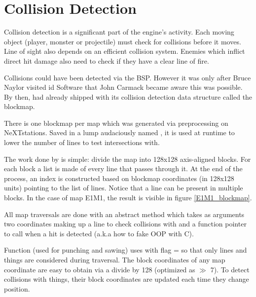 \section{Collision Detection} \label{blockmapdetails}
Collision detection is a significant part of the engine's activity. Each moving object (player, monster or projectile) must check for collisions before it moves. Line of sight also depends on an efficient collision system. Enemies which inflict direct hit damage also need to check if they have a clear line of fire.\\
\par
Collisions could have been detected via the BSP. However it was only after Bruce Naylor visited id Software that John Carmack became aware this was possible. By then, \doom{} had already shipped with its collision detection data structure called the blockmap.\\
\par
\vspace{10pt}
\par
There is one blockmap per map which was generated via  preprocessing on NeXTstations. Saved in a lump audaciously named , it is used at runtime to lower the number of lines to test intersections with.\\
\par
The work done by  is simple: divide the map into 128x128 axis-aligned blocks. For each block a list is made of every line that passes through it. At the end of the process, an index is constructed based on blockmap coordinates (in 128x128 units) pointing to the list of lines. Notice that a line can be present in multiple blocks. In the case of map E1M1, the result is visible in figure \ref{E1M1_blockmap}.


All map traversals are done with an abstract method  which takes as arguments two coordinates making up a line to check collisions with and a function pointer to call when a hit is detected (a.k.a how to fake OOP with C).\\
\par
{}
\par
Function  (used for punching and sawing) uses  with flag =  so that only lines and things are considered during traversal. The block coordinates of any map coordinate are easy to obtain via a divide by 128 (optimized as $\gg$ 7). To detect collisions with things, their block coordinates are updated each time they change position.\\
\par
{}
